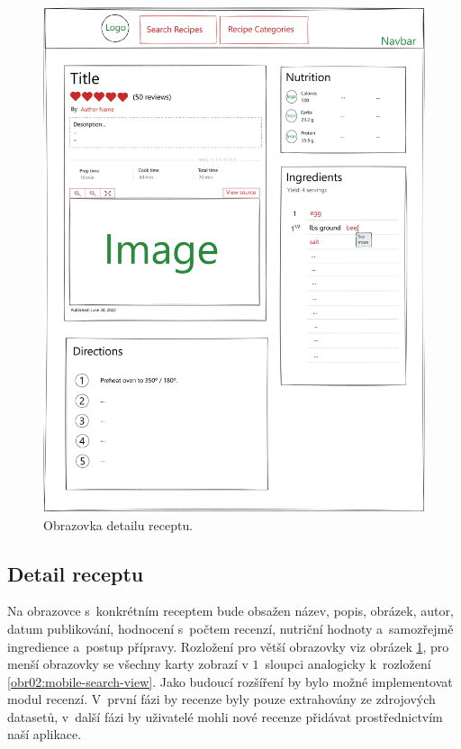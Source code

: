 \begin{figure}[p]\centering
\includegraphics[width=140mm]{../img/detail-view}
\caption{Obrazovka detailu receptu.}
\label{obr02:detail-view}
\end{figure}

\subsection{Detail receptu}

Na obrazovce s~konkrétním receptem bude obsažen název, popis, obrázek, autor, datum publikování, hodnocení s~počtem recenzí, nutriční hodnoty a~samozřejmě ingredience a~postup přípravy. Rozložení pro větší obrazovky viz obrázek \ref{obr02:detail-view}, pro menší obrazovky se všechny karty zobrazí v $1$~sloupci analogicky k~rozložení \ref{obr02:mobile-search-view}. Jako budoucí rozšíření by bylo možné implementovat modul recenzí. V~první fázi by recenze byly pouze extrahovány ze zdrojových datasetů, v~další fázi by uživatelé mohli nové recenze přidávat prostřednictvím naší aplikace.

